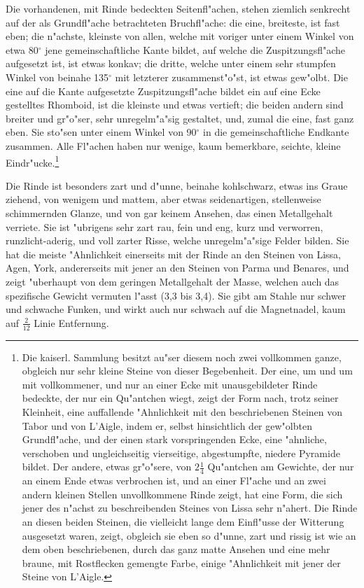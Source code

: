 \documentclass[a4paper, 11pt, oneside, german]{article}
\begin{document}
Die vorhandenen, mit Rinde bedeckten Seitenfl"achen, stehen ziemlich senkrecht auf der als Grundfl"ache betrachteten Bruchfl"ache: die eine, breiteste, ist fast eben; die n"achste, kleinste von allen, welche mit voriger unter einem Winkel von etwa 80$^{\circ}$ jene gemeinschaftliche Kante bildet, auf welche die Zuspitzungsfl"ache aufgesetzt ist, ist etwas konkav; die dritte, welche unter einem sehr stumpfen Winkel von beinahe 135$^{\circ}$ mit letzterer zusammenst"o"st, ist etwas gew"olbt. Die eine auf die Kante aufgesetzte Zuspitzungsfl"ache bildet ein auf eine Ecke gestelltes Rhomboid, ist die kleinste und etwas vertieft; die beiden andern sind breiter und gr"o"ser, sehr unregelm"a"sig gestaltet, und, zumal die eine, fast ganz eben. Sie sto"sen unter einem Winkel von 90$^{\circ}$ in die gemeinschaftliche Endkante zusammen. Alle Fl"achen haben nur wenige, kaum bemerkbare, seichte, kleine Eindr"ucke.\footnote{Die kaiserl. Sammlung besitzt au"ser diesem noch zwei vollkommen ganze, obgleich nur sehr kleine Steine von dieser Begebenheit. Der eine, um und um mit vollkommener, und nur an einer Ecke mit unausgebildeter Rinde bedeckte, der nur ein Qu"antchen wiegt, zeigt der Form nach, trotz seiner Kleinheit, eine auffallende "Ahnlichkeit mit den beschriebenen Steinen von Tabor und von L'Aigle, indem er, selbst hinsichtlich der gew"olbten Grundfl"ache, und der einen stark vorspringenden Ecke, eine "ahnliche, verschoben und ungleichseitig vierseitige, abgestumpfte, niedere Pyramide bildet. Der andere, etwas gr"o"sere, von $2\frac{1}{4}$ Qu"antchen am Gewichte, der nur an einem Ende etwas verbrochen ist, und an einer Fl"ache und an zwei andern kleinen Stellen unvollkommene Rinde zeigt, hat eine Form, die sich jener des n"achst zu beschreibenden Steines von Lissa sehr n"ahert. Die Rinde an diesen beiden Steinen, die vielleicht lange dem Einfl"usse der Witterung ausgesetzt waren, zeigt, obgleich sie eben so d"unne, zart und rissig ist wie an dem oben beschriebenen, durch das ganz matte Ansehen und eine mehr braune, mit Rostflecken gemengte Farbe, einige "Ahnlichkeit mit jener der Steine von L'Aigle.}

Die Rinde ist besonders zart und d"unne, beinahe kohlschwarz, etwas ins Graue ziehend, von wenigem und mattem, aber etwas seidenartigen, stellenweise schimmernden Glanze, und von gar keinem Ansehen, das einen Metallgehalt verriete. Sie ist "ubrigens sehr zart rau, fein und eng, kurz und verworren, runzlicht-aderig, und voll zarter Risse, welche unregelm"a"sige Felder bilden. Sie hat die meiste "Ahnlichkeit einerseits mit der Rinde an den Steinen von Lissa, Agen, York, andererseits mit jener an den Steinen von Parma und Benares, und zeigt "uberhaupt von dem geringen Metallgehalt der Masse, welchen auch das spezifische Gewicht vermuten l"asst (3,3 bis 3,4). Sie gibt am Stahle nur schwer und schwache Funken, und wirkt auch nur schwach auf die Magnetnadel, kaum auf $\frac{2}{12}$ Linie Entfernung.
\end{document}

